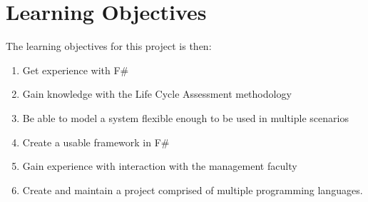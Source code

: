 \section{Learning Objectives}\label{sec:LearningObjectives}
The learning objectives for this project is then:
\begin{enumerate}
    \item Get experience with F\#
    \item Gain knowledge with the Life Cycle Assessment methodology
    \item Be able to model a system flexible enough to be used in multiple scenarios
    \item Create a usable framework in F\#
    \item Gain experience with interaction with the management faculty
    \item Create and maintain a project comprised of multiple programming languages.
    
\end{enumerate}